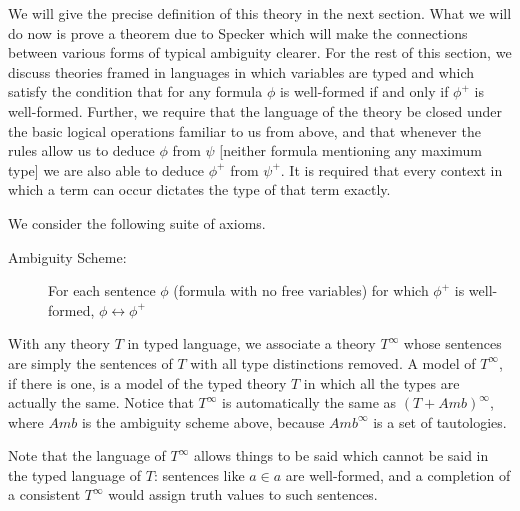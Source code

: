 \documentclass[12pt]{book}
\begin{document}
We will give the precise definition of this theory in the next
section.  What we will do now is prove a theorem due to Specker which
will make the connections between various forms of typical ambiguity
clearer.  For the rest of this section, we discuss theories framed in
languages in which variables are typed and which satisfy the condition
that for any formula $\phi$ is well-formed if and only if $\phi^+$ is
well-formed.  Further, we require that the language of the theory be
closed under the basic logical operations familiar to us from above,
and that whenever the rules allow us to deduce $\phi$ from $\psi$
[neither formula mentioning any maximum type] we are also able to
deduce $\phi^+$ from $\psi^+$.  It is required that every context in
which a term can occur dictates the type of that term exactly.

We consider the following suite of axioms.

\begin{description}

\item[Ambiguity Scheme:] For each sentence $\phi$ (formula with no
free variables) for which $\phi^+$ is well-formed, $\phi
\leftrightarrow \phi^+$

\end{description}

With any theory $T$ in typed language, we associate a theory
$T^{\infty}$ whose sentences are simply the sentences of $T$ with all
type distinctions removed.  A model of $T^{\infty}$, if there is one,
is a model of the typed theory $T$ in which all the types are actually
the same.  Notice that $T^{\infty}$ is automatically the same as $(T +
Amb)^{\infty}$, where $Amb$ is the ambiguity scheme above, because
$Amb^{\infty}$ is a set of tautologies.

Note that the language of $T^{\infty}$ allows things to be said which cannot be said in the typed language of $T$:  sentences like $a \in a$ are well-formed,
and a completion of a consistent $T^{\infty}$ would assign truth values to such sentences.
\end{document}
